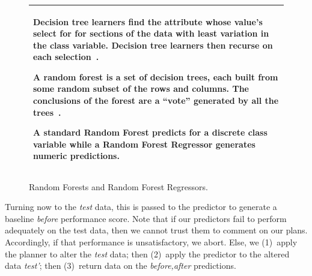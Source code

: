 \documentclass[conference]{IEEEtran}
\begin{document}
\begin{figure}[t!]
\small
\begin{tabular}{|p{.95\linewidth}|}\hline
 Decision tree learners find the attribute whose value's
select for for sections of the data with least variation in the class
variable. Decision tree learners then recurse on each selection~\cite{breiman84}. 

A random forest is a set of decision trees, each built
from some random subset of the rows and columns. The conclusions
of the forest are a ``vote'' generated by all the trees~\cite{Breiman2001}. 

A standard Random Forest predicts for a discrete class variable while
a Random Forest Regressor generates numeric predictions.\\\hline
\end{tabular}
\caption{Random Forests and Random Forest Regressors.}\label{fig:rr}
\end{figure}


Turning now to the {\em test} data, this is passed to the { predictor}
to generate a baseline {\em before} performance score.
Note that if our { predictors} fail to perform adequately on the test data,
then we cannot trust them to comment on our plans. Accordingly,
if that performance is unsatisfactory, we abort.
Else, we (1)~apply the { planner} to alter the {\em test} data;
then (2)~apply the { predictor} to the altered data {\em test'};
then (3)~return data on the {\em before,after} predictions.
\end{document}
